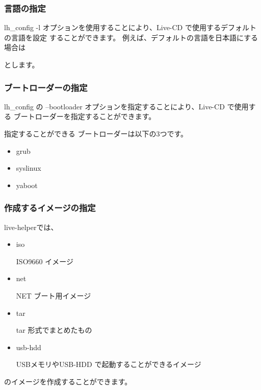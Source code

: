 \documentclass[mingoth,a4paper]{jsarticle}
\begin{document}
\begin{commandline}
\end{commandline}

\subsubsection{言語の指定}
lh\_config -l オプションを使用することにより、Live-CD で使用するデフォルトの言語を設定
することができます。
例えば、デフォルトの言語を日本語にする場合は
\begin{commandline}
\end{commandline}
とします。

\subsubsection{ブートローダーの指定}
lh\_config の --bootloader オプションを指定することにより、Live-CD で使用する
ブートローダーを指定することができます。

\begin{commandline}
\end{commandline}

指定することができる ブートローダーは以下の3つです。
\begin{itemize}
\item grub
\item syslinux
\item yaboot
\end{itemize}

\subsubsection{作成するイメージの指定}
live-helperでは、
\begin{itemize}
\item iso 

ISO9660 イメージ
\item net

NET ブート用イメージ 
\item tar 

tar 形式でまとめたもの

\item usb-hdd

USBメモリやUSB-HDD で起動することができるイメージ

\end{itemize}
のイメージを作成することができます。
\end{document}
